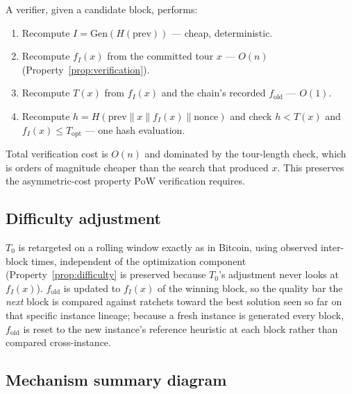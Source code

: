 \documentclass[journal]{IEEEtran}
\begin{document}
A verifier, given a candidate block, performs:
\begin{enumerate}[nosep]
\item Recompute $I = \mathrm{Gen}(H(\text{prev}))$ --- cheap, deterministic.
\item Recompute $f_I(x)$ from the committed tour $x$ --- $O(n)$
(Property~\ref{prop:verification}).
\item Recompute $T(x)$ from $f_I(x)$ and the chain's recorded $f_{\text{old}}$
--- $O(1)$.
\item Recompute $h = H(\text{prev}\|x\|f_I(x)\|\text{nonce})$ and check
$h < T(x)$ and $f_I(x) \le T_{\text{opt}}$ --- one hash evaluation.
\end{enumerate}
Total verification cost is $O(n)$ and dominated by the tour-length check, which
is orders of magnitude cheaper than the search that produced $x$. This
preserves the asymmetric-cost property PoW verification requires.

\subsection{Difficulty adjustment}

$T_0$ is retargeted on a rolling window exactly as in Bitcoin, using observed
inter-block times, independent of the optimization component
(Property~\ref{prop:difficulty} is preserved because $T_0$'s adjustment never
looks at $f_I(x)$). $f_{\text{old}}$ is updated to $f_I(x)$ of the winning
block, so the quality bar the \emph{next} block is compared against ratchets
toward the best solution seen so far on that specific instance lineage; because
a fresh instance is generated every block, $f_{\text{old}}$ is reset to the
new instance's reference heuristic at each block rather than compared
cross-instance.

\subsection{Mechanism summary diagram}
\end{document}
